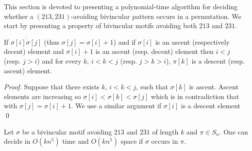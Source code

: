 \documentclass[a4paper]{llncs}
\newcommand{\pmotif}{\sigma}
\begin{document}
This section is devoted to presenting a polynomial-time algorithm for deciding whether
a $(213,231)$-avoiding bivincular pattern occurs in a permutation.
We start by presenting a property of bivincular motifs avoiding both $213$ and $231$.

\begin{lemma}
\label{lemma:ascentDescentAscent}
If $\overline{\sigma[i]\sigma[j]}$ (thus $\sigma[j]=\sigma[i]+1$) and 
if $\sigma[i]$ is an ascent (respectively decent) element and $\sigma[i]+1$ is an ascent 
(resp. decent) element then 
$i<j$ (resp. $j>i$) and for every $k$, $i<k<j$ (resp. $j>k>i$), $\pi[k]$ is a descent 
(resp. ascent) element.    
\end{lemma}

\begin{proof}
Suppose that there exists $k$, $i<k<j$,
such that $\pmotif[k]$ is ascent. Ascent elements are increasing  so $\sigma[i]<\sigma[k]<\sigma[j]$ which is in contradiction that with $\sigma[j]=\sigma[i]+1$.
We use a similar argument if $\sigma[i]$ is a descent element
\qed
\end{proof}

\begin{proposition}
	\label{Proposition:bivincular pattern}
		Let $\sigma$ be a bivincular motif avoiding $213$ and $231$ of length $k$
		and $\pi \in S_n$.
		One can decide in $O(kn^5)$ time
		and $O(kn^5)$ space if $\sigma$ occurs in $\pi$.
\end{proposition}
\end{document}
